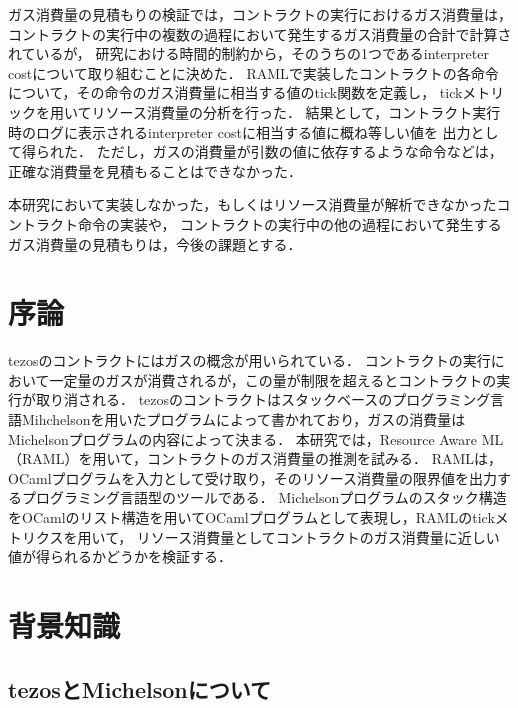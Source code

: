 \documentclass{kuisthesis}
\begin{document}
\begin{jabstract}
ガス消費量の見積もりの検証では，コントラクトの実行におけるガス消費量は，
コントラクトの実行中の複数の過程において発生するガス消費量の合計で計算されているが，
研究における時間的制約から，そのうちの1つであるinterpreter costについて取り組むことに決めた．
RAMLで実装したコントラクトの各命令について，その命令のガス消費量に相当する値のtick関数を定義し，
tickメトリックを用いてリソース消費量の分析を行った．
結果として，コントラクト実行時のログに表示されるinterpreter costに相当する値に概ね等しい値を
出力として得られた．
ただし，ガスの消費量が引数の値に依存するような命令などは，正確な消費量を見積もることはできなかった．

本研究において実装しなかった，もしくはリソース消費量が解析できなかったコントラクト命令の実装や，
コントラクトの実行中の他の過程において発生するガス消費量の見積もりは，今後の課題とする．

\end{jabstract}

\begin{eabstract}

\end{eabstract}

\tableofcontents

\section{序論}\label{sec-intro}
tezosのコントラクトにはガスの概念が用いられている．
コントラクトの実行において一定量のガスが消費されるが，この量が制限を超えるとコントラクトの実行が取り消される．
tezosのコントラクトはスタックベースのプログラミング言語Mihchelsonを用いたプログラムによって書かれており，ガスの消費量はMichelsonプログラムの内容によって決まる．
本研究では，Resource Aware ML（RAML）を用いて，コントラクトのガス消費量の推測を試みる．
RAMLは，OCamlプログラムを入力として受け取り，そのリソース消費量の限界値を出力するプログラミング言語型のツールである．
Michelsonプログラムのスタック構造をOCamlのリスト構造を用いてOCamlプログラムとして表現し，RAMLのtickメトリクスを用いて，
リソース消費量としてコントラクトのガス消費量に近しい値が得られるかどうかを検証する．

\section{背景知識}\label{sec-preliminary}
\subsection{tezosとMichelsonについて}\label{subsec-pre-tezos}
\end{document}
